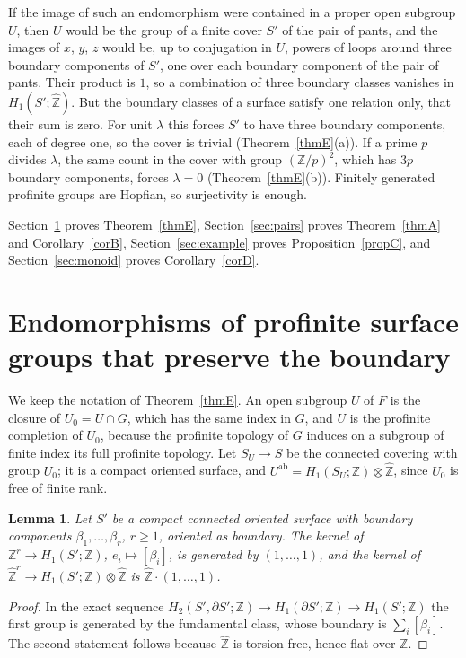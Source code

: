 \documentclass[11pt]{amsart}
\newtheorem{lemma}[thm]{Lemma}
\theoremstyle{definition}
\theoremstyle{remark}
\newcommand{\Z}{\mathbb Z}
\newcommand{\Zh}{\widehat{\mathbb Z}}
\newcommand{\ab}{\mathrm{ab}}
\begin{document}
If the image of such an endomorphism were contained in a proper open subgroup $U$, then $U$ would be the group of a finite cover $S'$ of the pair of pants, and the images of $x$, $y$, $z$ would be, up to conjugation in $U$, powers of loops around three boundary components of $S'$, one over each boundary component of the pair of pants. Their product is $1$, so a combination of three boundary classes vanishes in $H_1(S';\Zh)$. But the boundary classes of a surface satisfy one relation only, that their sum is zero. For unit $\lambda$ this forces $S'$ to have three boundary components, each of degree one, so the cover is trivial (Theorem~\ref{thmE}(a)). If a prime $p$ divides $\lambda$, the same count in the cover with group $(\Z/p)^2$, which has $3p$ boundary components, forces $\lambda=0$ (Theorem~\ref{thmE}(b)). Finitely generated profinite groups are Hopfian, so surjectivity is enough.

Section~\ref{sec:surfaces} proves Theorem~\ref{thmE}, Section~\ref{sec:pairs} proves Theorem~\ref{thmA} and Corollary~\ref{corB}, Section~\ref{sec:example} proves Proposition~\ref{propC}, and Section~\ref{sec:monoid} proves Corollary~\ref{corD}.

\section{Endomorphisms of profinite surface groups that preserve the boundary}\label{sec:surfaces}

We keep the notation of Theorem~\ref{thmE}. An open subgroup $U$ of $F$ is the closure of $U_0=U\cap G$, which has the same index in $G$, and $U$ is the profinite completion of $U_0$, because the profinite topology of $G$ induces on a subgroup of finite index its full profinite topology. Let $S_U\to S$ be the connected covering with group $U_0$; it is a compact oriented surface, and $U^{\ab}=H_1(S_U;\Z)\otimes\Zh$, since $U_0$ is free of finite rank.

\begin{lemma}\label{lem:boundary}
Let $S'$ be a compact connected oriented surface with boundary components $\beta_1,\dots,\beta_r$, $r\ge1$, oriented as boundary. The kernel of $\Z^r\to H_1(S';\Z)$, $e_i\mapsto[\beta_i]$, is generated by $(1,\dots,1)$, and the kernel of $\Zh^r\to H_1(S';\Z)\otimes\Zh$ is $\Zh\cdot(1,\dots,1)$.
\end{lemma}

\begin{proof}
In the exact sequence $H_2(S',\partial S';\Z)\to H_1(\partial S';\Z)\to H_1(S';\Z)$ the first group is generated by the fundamental class, whose boundary is $\sum_i[\beta_i]$. The second statement follows because $\Zh$ is torsion-free, hence flat over $\Z$.
\end{proof}
\end{document}

